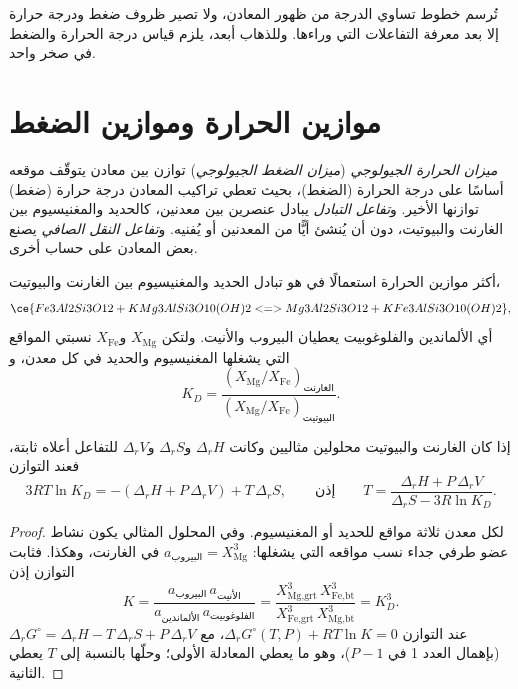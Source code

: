 تُرسم خطوط تساوي الدرجة من ظهور المعادن، ولا تصير ظروف ضغط
ودرجة حرارة إلا بعد معرفة التفاعلات التي وراءها. وللذهاب أبعد، يلزم قياس
درجة الحرارة والضغط في صخر واحد.

\section{موازين الحرارة وموازين الضغط}\label{sec:b2:pt-paths:thermobarometry}

\begin{definition}\label{def:b2:pt-paths:thermobarometry}
\emph{ميزان الحرارة الجيولوجي} (\emph{ميزان الضغط الجيولوجي})
توازن بين معادن يتوقّف موقعه أساسًا على درجة الحرارة (الضغط)، بحيث
تعطي تراكيب المعادن درجة حرارة (ضغط) توازنها
الأخير. و\emph{تفاعل التبادل} يبادل عنصرين
بين معدنين، كالحديد والمغنيسيوم بين الغارنت والبيوتيت، دون أن
يُنشئ أيًّا من المعدنين أو يُفنيه. و\emph{تفاعل النقل الصافي}
يصنع بعض المعادن على حساب أخرى.
\end{definition}

أكثر موازين الحرارة استعمالًا في  هو تبادل الحديد والمغنيسيوم
بين الغارنت والبيوتيت،
\[
\ce{Fe3Al2Si3O12 + KMg3AlSi3O10(OH)2 <=> Mg3Al2Si3O12 + KFe3AlSi3O10(OH)2},
\]
أي الألماندين والفلوغوبيت يعطيان البيروب والأنيت. ولتكن $X_{\text{Mg}}$ و$X_{\text{Fe}}$
نسبتي المواقع التي يشغلها المغنيسيوم والحديد في كل معدن، و
\[
K_D = \frac{(X_{\text{Mg}}/X_{\text{Fe}})_{\text{الغارنت}}}{(X_{\text{Mg}}/X_{\text{Fe}})_{\text{البيوتيت}}}.
\]

\begin{proposition}\label{prop:b2:pt-paths:exchange}
إذا كان الغارنت والبيوتيت محلولين مثاليين وكانت $\Delta_r H$ و$\Delta_r S$ و$\Delta_r V$
للتفاعل أعلاه ثابتة، فعند التوازن
\[
3RT\ln K_D = -(\Delta_r H + P\,\Delta_r V) + T\,\Delta_r S,
\qquad\text{إذن}\qquad
T = \frac{\Delta_r H + P\,\Delta_r V}{\Delta_r S - 3R\ln K_D}.
\]
\end{proposition}

\begin{proof}
لكل معدن ثلاثة مواقع للحديد أو المغنيسيوم. وفي المحلول المثالي يكون نشاط
عضو طرفي جداء نسب مواقعه التي يشغلها: $a_{\text{البيروب}} =
X_{\text{Mg}}^3$ في الغارنت، وهكذا. فثابت التوازن إذن
\[
K = \frac{a_{\text{البيروب}}\,a_{\text{الأنيت}}}{a_{\text{الألماندين}}\,a_{\text{الفلوغوبيت}}}
= \frac{X_{\text{Mg,grt}}^3\,X_{\text{Fe,bt}}^3}{X_{\text{Fe,grt}}^3\,X_{\text{Mg,bt}}^3} = K_D^3 .
\]
عند التوازن $\Delta_r G^\circ(T, P) + RT\ln K = 0$، مع $\Delta_r G^\circ = \Delta_r H -
T\,\Delta_r S + P\,\Delta_r V$ (بإهمال العدد 1 في $P - 1$)، وهو ما يعطي المعادلة الأولى؛
وحلّها بالنسبة إلى $T$ يعطي الثانية.
\end{proof}

